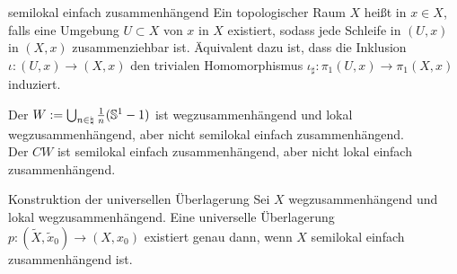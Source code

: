 \begin{Def}{semilokal einfach zusammenhängend}
    Ein topologischer Raum $X$ heißt
     in $x \in X$, falls eine
    Umgebung $U \subset X$ von $x$ in $X$ existiert, sodass jede Schleife in
    $(U, x)$ in $(X, x)$ zusammenziehbar ist.
    Äquivalent dazu ist, dass die Inklusion
    $\iota\colon (U, x) \rightarrow (X, x)$ den trivialen Homomorphismus
    $\iota_\sharp\colon \pi_1(U, x) \rightarrow \pi_1(X, x)$ induziert.
\end{Def}

\begin{Bsp}
    Der 
    $W := \bigcup_{n \in \natural} \frac{1}{n} (\mathbb{S}^1 - 1)$ ist
    wegzusammenhängend und lokal wegzusammenhängend, aber nicht
    semilokal einfach zusammenhängend. \\
    Der  $CW$ ist semilokal einfach
    zusammenhängend, aber nicht lokal einfach zusammenhängend.
\end{Bsp}

\linie

\begin{Satz}{Konstruktion der universellen Überlagerung}
    Sei $X$ wegzusammenhängend und lokal wegzusammenhängend.
    Eine universelle Überlagerung
    $p\colon (\widetilde{X}, \widetilde{x}_0) \rightarrow (X, x_0)$
    existiert genau dann, wenn $X$ semilokal einfach zusammenhängend ist.
\end{Satz}

\pagebreak
